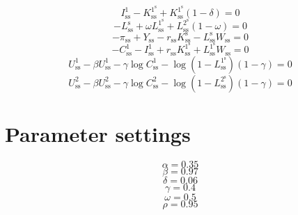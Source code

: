 \begin{equation}
I^{\mathrm{1}}_\mathrm{ss} - K^{\mathrm{1}^{\mathrm{s}}}_\mathrm{ss} + {K^{\mathrm{1}^{\mathrm{s}}}_\mathrm{ss}} \left(1 - \delta\right) = 0
\end{equation}
\begin{equation}
-L^{\mathrm{s}}_\mathrm{ss} + {\omega} {L^{\mathrm{1}^{\mathrm{s}}}_\mathrm{ss}} + {L^{\mathrm{2}^{\mathrm{s}}}_\mathrm{ss}} \left(1 - \omega\right) = 0
\end{equation}
\begin{equation}
-\pi_\mathrm{ss} + Y_\mathrm{ss} - {r_\mathrm{ss}} {K^{\mathrm{s}}_\mathrm{ss}} - {L^{\mathrm{s}}_\mathrm{ss}} {W_\mathrm{ss}} = 0
\end{equation}
\begin{equation}
-C^{\mathrm{1}}_\mathrm{ss} - I^{\mathrm{1}}_\mathrm{ss} + {r_\mathrm{ss}} {K^{\mathrm{1}^{\mathrm{s}}}_\mathrm{ss}} + {L^{\mathrm{1}^{\mathrm{s}}}_\mathrm{ss}} {W_\mathrm{ss}} = 0
\end{equation}
\begin{equation}
U^{\mathrm{1}}_\mathrm{ss} - {\beta} {U^{\mathrm{1}}_\mathrm{ss}} - {\gamma} {\log{C^{\mathrm{1}}_\mathrm{ss}}} - {\log\left(1 - L^{\mathrm{1}^{\mathrm{s}}}_\mathrm{ss}\right)} \left(1 - \gamma\right) = 0
\end{equation}
\begin{equation}
U^{\mathrm{2}}_\mathrm{ss} - {\beta} {U^{\mathrm{2}}_\mathrm{ss}} - {\gamma} {\log{C^{\mathrm{2}}_\mathrm{ss}}} - {\log\left(1 - L^{\mathrm{2}^{\mathrm{s}}}_\mathrm{ss}\right)} \left(1 - \gamma\right) = 0
\end{equation}






\section{Parameter settings}

\begin{equation}
\alpha = 0.35
\end{equation}
\begin{equation}
\beta = 0.97
\end{equation}
\begin{equation}
\delta = 0.06
\end{equation}
\begin{equation}
\gamma = 0.4
\end{equation}
\begin{equation}
\omega = 0.5
\end{equation}
\begin{equation}
\rho = 0.95
\end{equation}


